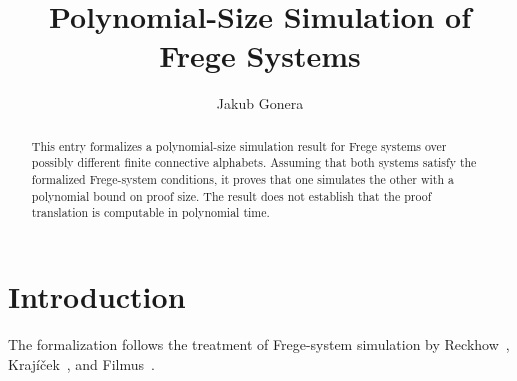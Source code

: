 \documentclass[11pt,a4paper]{article}
\begin{document}
\title{Polynomial-Size Simulation of Frege Systems}
\author{Jakub Gonera}
\date{}
\maketitle

\begin{abstract}
  This entry formalizes a polynomial-size simulation result for Frege systems
  over possibly different finite connective alphabets. Assuming that both
  systems satisfy the formalized Frege-system conditions, it proves that one
  simulates the other with a polynomial bound on proof size. The result does
  not establish that the proof translation is computable in polynomial time.
\end{abstract}

\tableofcontents
\clearpage

\section*{Introduction}
The formalization follows the treatment of Frege-system simulation by
Reckhow~\cite{Reckhow1976}, Kraj\'i\v{c}ek~\cite{Krajicek1995}, and
Filmus~\cite{Filmus2010}.





\end{document}
